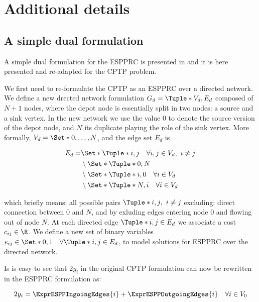 \chapter{Additional details}

\section{A simple dual formulation}\label{sec:cptp-simple-dual-formulation}

A simple dual formulation for the ESPPRC is presented in \cite{beasley1989algorithm} and it is here presented and re-adapted for the CPTP problem.

We first need to re-formulate the CPTP as an ESPPRC over a directed network.
We define a new drected network formulation $G_d = \Tuple*{V_d, E_d}$ composed of $N + 1$ nodes, where the depot node is essentially split in two nodes: a source and a sink vertex.
In the new network we use the value $0$ to denote the source version of the depot node, and $N$ its duplicate playing the role of the sink vertex.
More formally, $V_d = \Set*{ 0,\dots, N }$, and the edge set $E_d$ is

\begin{equation}
	\begin{aligned}
		E_d = & \Set*{\Tuple*{i, j} \quad \forall i, j \in V_d,\ i \ne j } \\
		      & \setminus \Set*{ \Tuple*{0, N} }                           \\
		      & \setminus \Set*{ \Tuple*{i, 0} \quad \forall i \in V_d }   \\
		      & \setminus \Set*{ \Tuple*{N, i} \quad \forall i \in V_d }   \\
	\end{aligned}
\end{equation}

which briefly means: all possible pairs $\Tuple*{i, j},\ i \ne j$ excluding: direct connection between $0$ and $N$, and by exluding edges entering node $0$ and flowing out of node $N$.
At each directed edge $\Tuple*{i, j} \in E_d$ we associate a cost $c_{ij} \in \R$.
We define a new set of binary variables $e_{ij} \in \Set*{0, 1} \quad \forall \Tuple*{i, j} \in E_d$, to model solutions for ESPPRC over the directed network.

Is is easy to see that $2 y_i$ in the original CPTP formulation can now be rewritten in the ESPPRC formulation as:

\begin{equation}
	2 y_i = \ExprESPPIngoingEdges{i} + \ExprESPPOutgoingEdges{i} \quad \forall i \in V_0
\end{equation}

